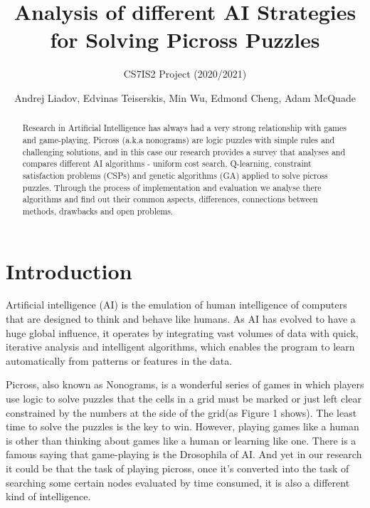 \documentclass{svproc}
\begin{document}
\mainmatter
\title{Analysis of different AI Strategies for Solving Picross Puzzles}
\subtitle{CS7IS2 Project (2020/2021)}
\author{Andrej Liadov, Edvinas Teiserskis, Min Wu, Edmond Cheng, Adam McQuade}

\maketitle              %


\begin{abstract}
Research in Artificial Intelligence has always had a very strong relationship with games and game-playing. Picross (a.k.a nonograms) are logic puzzles with simple rules and challenging solutions, and in this case our research provides a survey that analyses and compares different AI algorithms - uniform cost search, Q-learning, constraint satisfaction problems (CSPs) and genetic algorithms (GA) applied to solve picross puzzles. Through the process of implementation and evaluation we analyse there algorithms and find out their common aspects, differences, connections between methods, drawbacks and open problems.
\end{abstract}


\section{Introduction}
Artificial intelligence (AI) is the emulation of human intelligence of computers that are designed to think and behave like humans. As AI has evolved to have a huge global influence, it operates by integrating vast volumes of data with quick, iterative analysis and intelligent algorithms, which enables the program to learn automatically from patterns or features in the data.

Picross, also known as Nonograms, is a wonderful series of games in which players use logic to solve puzzles that the cells in a grid must be marked or just left clear constrained by the numbers at the side of the grid(as Figure 1 shows). The least time to solve the puzzles is the key to win. However, playing games like a human is other than thinking about games like a human or learning like one. There is a famous saying that game-playing is the Drosophila of AI. And yet in our research it could be that the task of playing picross, once it’s converted into the task of searching some certain nodes evaluated by time consumed, it is also a different kind of intelligence.
\end{document}
